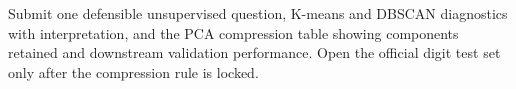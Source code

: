 \begin{labdeliverable}
Submit one defensible unsupervised question, K-means and DBSCAN diagnostics with interpretation, and the PCA compression table showing components retained and downstream validation performance. Open the official digit test set only after the compression rule is locked.
\end{labdeliverable}
